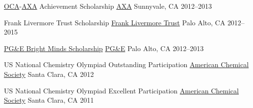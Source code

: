 \begin{cvhonors}
	\cvhonor
		{\href{https://www.ocanational.org}{OCA}-\href{https://us.axa.com/home.html}{\href{https://us.axa.com/}{AXA}} Achievement Scholarship} %
		{\href{https://us.axa.com/axa-foundation/AXA-achievement-scholarship.html}{AXA}} %
		{Sunnyvale, CA} %
		{2012--2013} %
		
	\cvhonor
		{Frank Livermore Trust Scholarship} %
		{\href{https://www.paloaltoonline.com/weekly/morgue/community_pulse/2000_Jun_21.OBITLEAD.html}{Frank Livermore Trust}} %
		{Palo Alto, CA} %
		{2012--2015} %
	
	\cvhonor
		{\href{https://www.pge.com/en_US/residential/in-your-community/education-programs/grants-and-scholarships/bright-mind-scholarships/bright-mind-scholarships.page}{PG\&E Bright Minds Scholarship}} %
		{\href{https://www.pge.com}{PG\&E}} %
		{Palo Alto, CA} %
		{2012--2013} %

\end{cvhonors}


\begin{cvhonors}

	\cvhonor
    	{US National Chemistry Olympiad Outstanding Participation} %
		{\href{https://www.acs.org/content/acs/en/education/students/highschool/olympiad.html}{American Chemical Society}} %
		{Santa Clara, CA} %
		{2012} %

	\cvhonor
		{US National Chemistry Olympiad Excellent Participation} %
		{\href{https://www.acs.org/content/acs/en/education/students/highschool/olympiad.html}{American Chemical Society}} %
		{Santa Clara, CA} %
		{2011} %

\end{cvhonors}



